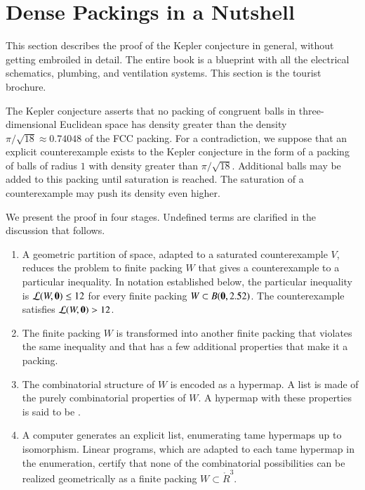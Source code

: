 \section{Dense Packings in a Nutshell}

This section describes the proof of the Kepler conjecture in general,
without
getting embroiled in detail.  The entire book
is a blueprint with all the electrical schematics, plumbing, and
ventilation systems.  This section is the tourist brochure.

The Kepler conjecture asserts that no packing of congruent balls in
three-dimensional Euclidean space has density greater than the density
$\pi/\sqrt{18} \approx 0.74048$ of the FCC packing.  For a contradiction, we suppose that an
explicit counterexample exists to the Kepler conjecture in the form of a
packing of balls of radius $1$ with density  greater than
$\pi/\sqrt{18}$.  Additional balls may be added to this packing until
saturation is reached.  The saturation of a counterexample may push its
density even higher.

We present the proof in four stages.  Undefined terms are clarified in the
discussion that follows.

\begin{enumerate}
\item A geometric partition of space, adapted to a saturated
  counterexample $V$, reduces the problem to finite packing $W$ that
  gives a counterexample to a particular inequality.  In notation
  established below, the particular inequality is ${\mathcal L}(W,{\mathbf 0})\le
  12$ for every finite packing $W\subset B({\mathbf 0},2.52)$.  The
  counterexample satisfies ${\mathcal L}(W,{\mathbf 0})>12$.
\item The finite packing $W$ is transformed into another finite packing that violates the same
inequality and that has a few additional properties that make it a  packing.
\item The combinatorial structure of $W$ is encoded as a hypermap.  A list is
  made of the purely combinatorial properties of $W$.  A hypermap with
  these properties is said to be .
\item A computer generates an explicit list, enumerating
  tame hypermaps up to isomorphism.  Linear programs, which are
  adapted to each tame hypermap in the enumeration, certify that
  none of the combinatorial possibilities can be  realized geometrically as a finite packing
  $W\subset \ring{R}^3$.  
\end{enumerate}
%


